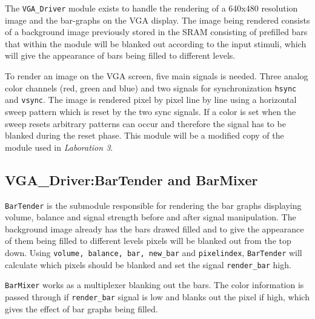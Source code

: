 The \verb+VGA_Driver+ module exists to handle the rendering of a 640x480 resolution image and the bar-graphs on the VGA display. The image being rendered consists of a background image previously stored in the SRAM consisting of prefilled bars that within the module will be blanked out according to the input stimuli, which will give the appearance of bars being filled to different levels.   

To render an image on the VGA screen, five main signals is needed. Three analog color channels (red, green and blue) and two signals for synchronization \verb=hsync= and \verb=vsync=. The image is rendered pixel by pixel line by line using a horizontal sweep pattern which is reset by the two sync signals. If a color is set when the sweep resets arbitrary patterns can occur and therefore the signal has to be blanked during the reset phase. This module will be a modified copy of the module used in \emph{Laboration 3}.


\subsection{VGA\_Driver:BarTender and BarMixer}\label{sec:BarTender}
\verb+BarTender+ is the submodule responsible for rendering the bar graphs displaying volume, balance and signal strength before and after signal manipulation. The background image already has the bars drawed filled and to give the appearance of them being filled to different levels pixels will be blanked out from the top down. Using \verb=volume, balance, bar, new_bar= and \verb=pixelindex=, \verb+BarTender+ will calculate which pixels should be blanked and set the signal \verb=render_bar= high.

\verb+BarMixer+ works as a multiplexer blanking out the bars. The color information is passed through if \verb=render_bar= signal is low and blanks out the pixel if high, which gives the effect of bar graphs being filled.

